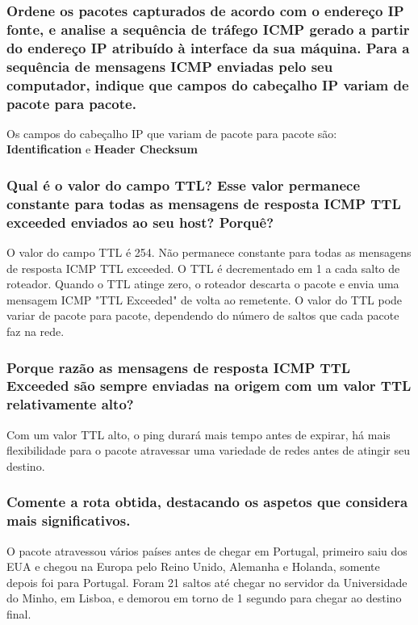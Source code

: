 \documentclass{article}
\begin{document}
\subsubsection{Ordene os pacotes capturados de acordo com o endereço IP fonte, e
analise a sequência de tráfego ICMP gerado a partir do endereço IP
atribuído à interface da sua máquina. Para a sequência de mensagens
ICMP enviadas pelo seu computador, indique que campos do cabeçalho
IP variam de pacote para pacote.}

Os campos do cabeçalho IP que variam de pacote para pacote são: \textbf{Identification} e \textbf{Header Checksum}

\subsubsection{Qual é o valor do campo TTL? Esse valor permanece constante
para todas as mensagens de resposta ICMP TTL exceeded
enviados ao seu host? Porquê?}

O valor do campo TTL é 254. Não permanece constante para todas as mensagens de resposta ICMP TTL exceeded. O TTL é decrementado em 1 a cada salto de roteador. Quando o TTL atinge zero, o roteador descarta o pacote e envia uma mensagem ICMP "TTL Exceeded" de volta ao remetente. O valor do TTL pode variar de pacote para pacote, dependendo do número de saltos que cada pacote faz na rede.

\subsubsection{Porque razão as mensagens de resposta ICMP TTL Exceeded são
sempre enviadas na origem com um valor TTL relativamente
alto?}

Com um valor TTL alto, o ping durará mais tempo antes de expirar, há mais flexibilidade para o pacote atravessar uma variedade de redes antes de atingir seu destino.

\subsubsection{Comente a rota obtida, destacando os aspetos que considera mais
significativos.}

O pacote atravessou vários países antes de chegar em Portugal, primeiro saiu dos EUA e chegou na Europa pelo Reino Unido, Alemanha e Holanda, somente depois foi para Portugal. Foram 21 saltos até chegar no servidor da Universidade do Minho, em Lisboa, e demorou em torno de 1 segundo para chegar ao destino final.
\end{document}
